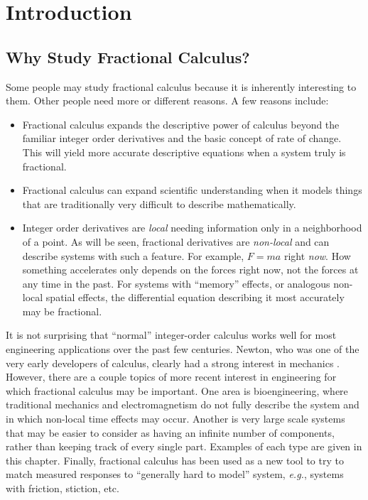 \chapter{Introduction}

\section{Why Study Fractional Calculus?}
Some people may study fractional calculus because it is inherently interesting to them. Other people need more or different reasons. A few reasons include:
\begin{itemize}
  \item Fractional calculus expands the descriptive power of calculus beyond the familiar integer order derivatives and the basic concept of rate of change. This will yield more accurate descriptive equations when a system truly is fractional.
  \item Fractional calculus can expand scientific understanding when it models things that are traditionally very difficult to describe mathematically.
  \item Integer order derivatives are \emph{local} needing information only in a neighborhood of a point. As will be seen, fractional derivatives are \emph{non-local} and can describe systems with such a feature. For example, $F=ma$ right \emph{now}. How something accelerates only depends on the forces right now, not the forces at any time in the past. For systems with ``memory'' effects, or analogous non-local spatial effects, the differential equation describing it most accurately may be fractional.
\end{itemize}

It is not surprising that ``normal'' integer-order calculus works well for most engineering applications over the past few centuries. Newton, who was one of the very early developers of calculus, clearly had a strong interest in mechanics \cite{principia}. However, there are a couple topics of more recent interest in engineering for which fractional calculus may be important. One area is bioengineering, where traditional mechanics and electromagnetism do not fully describe the system and in which non-local time effects may occur. Another is very large scale systems that may be easier to consider as having an infinite number of components, rather than keeping track of every single part. Examples of each type are given in this chapter.  Finally, fractional calculus has been used as a new tool to try to match measured responses to ``generally hard to model'' system, \textit{e.g.}, systems with friction, stiction, etc. 

